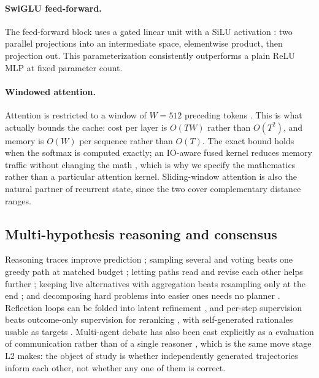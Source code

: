 \documentclass[11pt,a4paper]{article}
\theoremstyle{plain}
\theoremstyle{definition}
\theoremstyle{remark}
\begin{document}
\paragraph{SwiGLU feed-forward.}
The feed-forward block uses a gated linear unit with a SiLU activation
\cite{shazeer2020glu}: two parallel projections into an intermediate space,
elementwise product, then projection out. This parameterization consistently
outperforms a plain ReLU MLP at fixed parameter count.

\paragraph{Windowed attention.}
Attention is restricted to a window of $W = 512$ preceding tokens
\cite{jiang2023mistral}. This is what actually bounds the cache: cost per
layer is $O(TW)$ rather than $O(T^2)$, and memory is $O(W)$ per sequence
rather than $O(T)$. The exact bound holds when the softmax is computed exactly;
an IO-aware fused kernel reduces memory traffic without changing the math
\cite{dao2023fa2}, which is why we specify the mathematics rather than a
particular attention kernel. Sliding-window attention is also the natural
partner of recurrent state, since the two cover complementary distance ranges.

\subsection{Multi-hypothesis reasoning and consensus}

\noindent
Reasoning traces improve prediction \cite{wei2022cot}; sampling several and
voting beats one greedy path at matched budget \cite{wang2022sc}; letting
paths read and revise each other helps further
\cite{du2023debate,liang2023divergent}; keeping live alternatives with
aggregation beats resampling only at the end \cite{yao2023tot,besta2024got};
and decomposing hard problems into easier ones needs no planner
\cite{zhou2022l2m}. Reflection loops can be folded into latent refinement
\cite{shinn2023reflexion,madaan2023selfrefine}, and per-step supervision beats
outcome-only supervision for reranking \cite{lightman2023verify,uesato2022processfb},
with self-generated rationales usable as targets
\cite{huang2022selfimprove,zelikman2022star}. Multi-agent debate has also been
cast explicitly as a evaluation of communication rather than of a single
reasoner \cite{chan2023chateval}, which is the same move stage L2 makes: the
object of study is whether independently generated trajectories inform each
other, not whether any one of them is correct.
\end{document}

